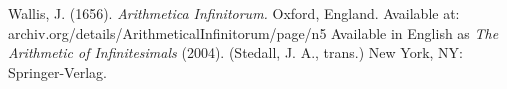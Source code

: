 \documentclass[11pt]{amsart}
\theoremstyle{definition}
\begin{document}
\begin{thebibliography}{Wal56}
 Wallis, J. (1656). \textit{Arithmetica Infinitorum.} Oxford, England. Available at: archiv.org/details/ArithmeticalInfinitorum/page/n5 Available in English as \textit{The Arithmetic of Infinitesimals} (2004). (Stedall, J. A., trans.) New York, NY: Springer-Verlag.
\end{thebibliography}
\end{document}
